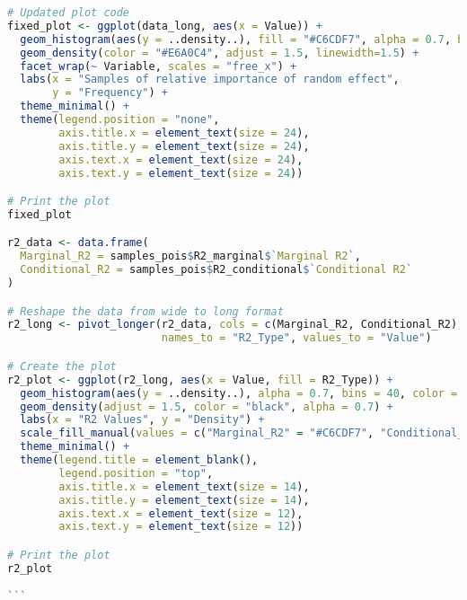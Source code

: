 \begin{lstlisting}[language=R, caption=Usage of the BayesianImpGLMM package with plots and examples.]
# Updated plot code
fixed_plot <- ggplot(data_long, aes(x = Value)) +
  geom_histogram(aes(y = ..density..), fill = "#C6CDF7", alpha = 0.7, bins = 40, color = "black") +
  geom_density(color = "#E6A0C4", adjust = 1.5, linewidth=1.5) +
  facet_wrap(~ Variable, scales = "free_x") +
  labs(x = "Samples of relative importance of random effect",
       y = "Frequency") +
  theme_minimal() +
  theme(legend.position = "none",
        axis.title.x = element_text(size = 24),
        axis.title.y = element_text(size = 24),
        axis.text.x = element_text(size = 24),
        axis.text.y = element_text(size = 24))

# Print the plot
fixed_plot

r2_data <- data.frame(
  Marginal_R2 = samples_pois$R2_marginal$`Marginal R2`,
  Conditional_R2 = samples_pois$R2_conditional$`Conditional R2`
)

# Reshape the data from wide to long format
r2_long <- pivot_longer(r2_data, cols = c(Marginal_R2, Conditional_R2),
                        names_to = "R2_Type", values_to = "Value")

# Create the plot
r2_plot <- ggplot(r2_long, aes(x = Value, fill = R2_Type)) +
  geom_histogram(aes(y = ..density..), alpha = 0.7, bins = 40, color = "black") +
  geom_density(adjust = 1.5, color = "black", alpha = 0.7) +
  labs(x = "R2 Values", y = "Density") +
  scale_fill_manual(values = c("Marginal_R2" = "#C6CDF7", "Conditional_R2" = "#E6A0C4")) +
  theme_minimal() +
  theme(legend.title = element_blank(),
        legend.position = "top",
        axis.title.x = element_text(size = 14),
        axis.title.y = element_text(size = 14),
        axis.text.x = element_text(size = 12),
        axis.text.y = element_text(size = 12))

# Print the plot
r2_plot

```
\end{lstlisting}